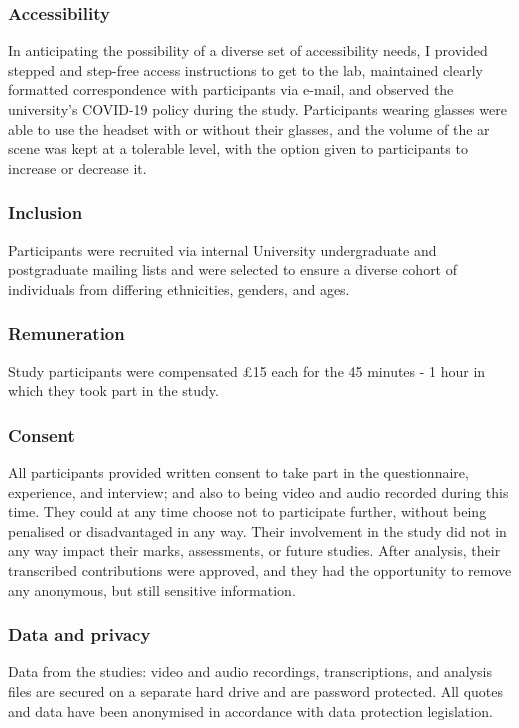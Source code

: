 \subsubsection{Accessibility}\label{sec: polaris-ethics-accessibility}
In anticipating the possibility of a diverse set of accessibility needs, I provided stepped and step-free access instructions to get to the lab, maintained clearly formatted correspondence with participants via e-mail, and observed the university's COVID-19 policy during the study. Participants wearing glasses were able to use the headset with or without their glasses, and the volume of the \gls{ar} scene was kept at a tolerable level, with the option given to participants to increase or decrease it.

\subsubsection{Inclusion}\label{sec: polaris-ethics-inclusion}
Participants were recruited via internal University undergraduate and postgraduate mailing lists and were selected to ensure a diverse cohort of individuals from differing ethnicities, genders, and ages.

\subsubsection{Remuneration}\label{sec: polaris-ethics-renumeration}
Study participants were compensated \pounds15 each for the 45 minutes - 1 hour in which they took part in the study.

\subsubsection{Consent}\label{sec: polaris-ethics-consent}
All participants provided written consent to take part in the questionnaire, experience, and interview; and also to being video and audio recorded during this time. They could at any time choose not to participate further, without being penalised or disadvantaged in any way. Their involvement in the study did not in any way impact their marks, assessments, or future studies. After analysis, their transcribed contributions were approved, and they had the opportunity to remove any anonymous, but still sensitive information.

\subsubsection{Data and privacy}\label{sec: polaris-ethics-data}
Data from the studies: video and audio recordings, transcriptions, and analysis files are secured on a separate hard drive and are password protected. All quotes and data have been anonymised in accordance with data protection legislation.


